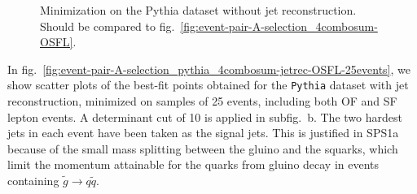 \documentclass[twoside,english]{uiofysmaster}
\begin{document}
\begin{figure}[hbt]
\begin{subfigure}[b]{0.45\textwidth}
		\caption{ }
		\label{fig:event-pair-A-selection_pythia_4combosum-OSFL-25events_b} 
	\end{subfigure}
	\caption{Minimization on the Pythia dataset without jet reconstruction. Should be compared to fig.\ \ref{fig:event-pair-A-selection_4combosum-OSFL}.}
	\label{fig:event-pair-A-selection_pythia_4combosum-OSFL-25events}
\end{figure}

In fig.\ \ref{fig:event-pair-A-selection_pythia_4combosum-jetrec-OSFL-25events}, we show scatter plots of the best-fit points obtained for the {\tt Pythia} dataset with jet reconstruction, minimized on samples of 25 events, including both OF and SF lepton events. A determinant cut of 10 is applied in subfig.\ b. The two hardest jets in each event have been taken as the signal jets. This is justified in SPS1a because of the small mass splitting between the gluino and the squarks, which limit the momentum attainable for the quarks from gluino decay in events containing $\tilde g \to q\tilde q$. 
\end{document}
